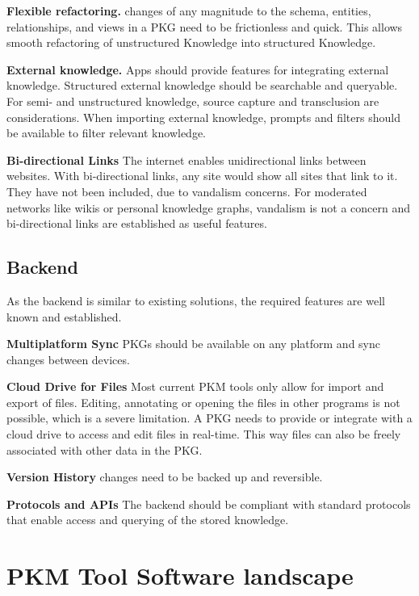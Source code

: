 \textbf{Flexible refactoring.} changes of any magnitude to the schema, entities, relationships, and views in a PKG need to be frictionless and quick. This allows smooth refactoring of unstructured Knowledge into structured Knowledge.

\textbf{External knowledge.} Apps should provide features for integrating external knowledge. Structured external knowledge should be searchable and queryable. For semi- and unstructured knowledge, source capture and transclusion are considerations. When importing external knowledge, prompts and filters should be available to filter relevant knowledge.
    
\textbf{Bi-directional Links} The internet enables unidirectional links between websites. With bi-directional links, any site would show all sites that link to it. They have not been included, due to vandalism concerns. For moderated networks like wikis or personal knowledge graphs, vandalism is not a concern and bi-directional links are established as useful features.

\subsection*{Backend}
As the backend is similar to existing solutions, the required features are well known and established.

\textbf{Multiplatform Sync} PKGs should be available on any platform and sync changes between devices.

\textbf{Cloud Drive for Files} Most current PKM tools only allow for import and export of files. Editing, annotating or opening the files in other programs is not possible, which is a severe limitation. A PKG needs to provide or integrate with a cloud drive to access and edit files in real-time. This way files can also be freely associated with other data in the PKG.

\textbf{Version History} changes need to be backed up and reversible.

\textbf{Protocols and APIs} The backend should be compliant with standard protocols that enable access and querying of the stored knowledge.

\section{PKM Tool Software landscape}

